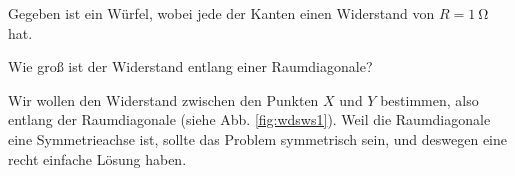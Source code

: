 \documentclass[a4paper,parskip=half]{scrartcl}
\begin{document}
\begin{exercise}[ID=wdsw, subtitle = Widerstandswürfel , difficulty = 2]
  Gegeben ist ein Würfel, wobei jede der Kanten einen Widerstand von $R =
  \SI{1}{\ohm}$ hat.
  
  Wie groß ist der Widerstand entlang einer Raumdiagonale?
\end{exercise}
\begin{solution}
  Wir wollen den Widerstand zwischen den Punkten $X$ und $Y$ bestimmen, also
  entlang der Raumdiagonale (siehe Abb. \ref{fig:wdsws1}). Weil die
  Raumdiagonale eine Symmetrieachse ist, sollte das Problem symmetrisch sein,
  und deswegen eine recht einfache Lösung haben.
\end{solution}
\end{document}
